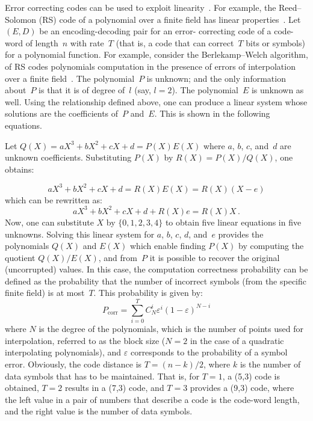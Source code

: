 \begin{multicols}{2}
\noindent
   Error correcting codes can be used to exploit linearity~\cite{8-dol}. For example, the 
   Reed--Solomon (RS) code of a 
polynomial over a finite field has linear properties~\cite{7-dol}. Let $(E,D)$ be an encoding-decoding pair for an error-
correcting code of a code-word of length~$n$ with rate~$T$ (that is, a code that can correct~$T$ bits or symbols) for a 
polynomial function. For example, consider the Berlekamp--Welch algorithm, of RS codes polynomials 
computation in the presence of errors of interpolation over a finite field~\cite{9-dol}.  The polynomial~$P$  is unknown; 
and the only information about~$P$ is that it is of degree of~$l$ (say, $l=2$). The polynomial~$E$ is unknown as well. 
Using the relationship defined above, one can produce a linear system whose solutions are the coefficients of~$P$ 
and~$E$.  This is shown in the following equations.
   
   Let $Q(X)=aX^3+bX^2+cX+d=P(X) E(X)$ where $a$, $b$, $c$, and~$d$ are unknown coefficients. 
Substituting $P(X)$ by $R(X)=P(X)/Q(X)$,  one obtains:

\noindent
   $$
   aX^3+bX^2+cX+d=R(X) E(X)=R(X) (X-e)
   $$
   which can be rewritten as: 
   $$
   aX^3+bX^2+cX+d+R(X) e =R(X) X\,.
   $$ 
   Now, one can substitute $X$ by $\{0,1,2,3,4\}$  to obtain five linear equations in five unknowns. Solving this linear 
system for $a$, $b$, $c$, $d$, and~$e$ provides the polynomials $Q(X)$ and $E(X)$ which enable finding $P(X)$ by 
computing the quotient $Q(X)/E(X)$, and from~$P$ it is possible to recover the original (uncorrupted) values. In this 
case, the computation correctness probability can be defined as the probability that the number of incorrect symbols 
(from the specific finite field) is at most~$T$. This probability is given by:  
   \begin{equation}
   P_{\mathrm{corr}}=\sum\limits_{i=0}^T C_N^i \varepsilon^i (1-\varepsilon)^{N-i}
   \label{e3-dol}
   \end{equation}
where $N$ is the degree of the polynomials, which is the 
number of points used for interpolation, referred to as the 
block size ($N=2$ in the case of a quadratic interpolating 
polynomials), and $\varepsilon$ corresponds to the probability of a symbol error. Obviously, the code distance is $T=(n-
k)/2$, where $k$ is the number of data symbols that has to be maintained. That is, for $T=1$,  a (5,3) code is obtained, 
$T=2$ results in a (7,3) code, and $T=3$ provides a (9,3) code, where the left value in a pair of numbers that describe a 
code is the code-word length, and the right value is the number of data symbols. 


\end{multicols}

